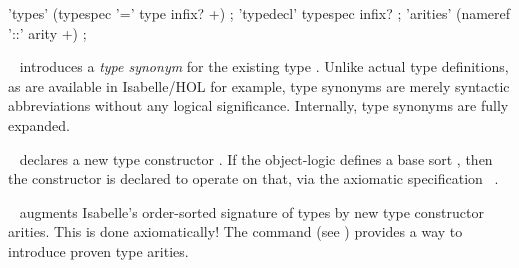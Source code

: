 \begin{isabellebody}
\begin{isamarkuptext}
  \begin{rail}
    'types' (typespec '=' type infix? +)
    ;
    'typedecl' typespec infix?
    ;
    'arities' (nameref '::' arity +)
    ;
  \end{rail}

  \begin{description}

  \item \hyperlink{command.types}{\mbox{}}~ introduces a
  \emph{type synonym}  for the existing type
  \isa{{\isachardoublequote}{\isasymtau}{\isachardoublequote}}.  Unlike actual type definitions, as are available in
  Isabelle/HOL for example, type synonyms are merely syntactic
  abbreviations without any logical significance.  Internally, type
  synonyms are fully expanded.
  
  \item \hyperlink{command.typedecl}{\mbox{}}~ declares a new
  type constructor .  If the object-logic defines a base sort
  , then the constructor is declared to operate on that, via
  the axiomatic specification \hyperlink{command.arities}{\mbox{}}~.

  \item \hyperlink{command.arities}{\mbox{}}~ augments
  Isabelle's order-sorted signature of types by new type constructor
  arities.  This is done axiomatically!  The \hyperlink{command.instance}{\mbox{}}
  command (see ) provides a way to introduce
  proven type arities.


\end{description}
\end{isamarkuptext}
\end{isabellebody}
